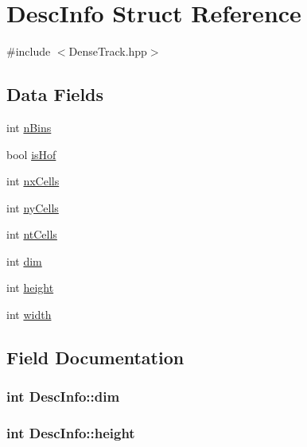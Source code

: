 \hypertarget{structDescInfo}{}\section{Desc\+Info Struct Reference}
\label{structDescInfo}


{\ttfamily \#include $<$Dense\+Track.\+hpp$>$}

\subsection*{Data Fields}
\begin{DoxyCompactItemize}
\item 
int \hyperlink{structDescInfo_a2bde776874112f43d29da2d9f41a1e59}{n\+Bins}
\item 
bool \hyperlink{structDescInfo_af63bbafd7460d3a13a1aed41ce3abcdd}{is\+Hof}
\item 
int \hyperlink{structDescInfo_ab00ff5d070ae53d16577e8578d624c7e}{nx\+Cells}
\item 
int \hyperlink{structDescInfo_a303f14d681cfc8a65d95d05c5ba77e52}{ny\+Cells}
\item 
int \hyperlink{structDescInfo_a2b010679bbd0b353d53164c5cea4fa8e}{nt\+Cells}
\item 
int \hyperlink{structDescInfo_a3374342a9cc783399c62ec2f36fc7b6e}{dim}
\item 
int \hyperlink{structDescInfo_ab2df923f0f6c2898ce3798cc72a9c314}{height}
\item 
int \hyperlink{structDescInfo_a4a2030ba863d45e2495e5f9dfafbe4b0}{width}
\end{DoxyCompactItemize}


\subsection{Field Documentation}
\hypertarget{structDescInfo_a3374342a9cc783399c62ec2f36fc7b6e}{}
\subsubsection[{dim}]{\setlength{\rightskip}{0pt plus 5cm}int Desc\+Info\+::dim}\label{structDescInfo_a3374342a9cc783399c62ec2f36fc7b6e}
\hypertarget{structDescInfo_ab2df923f0f6c2898ce3798cc72a9c314}{}
\subsubsection[{height}]{\setlength{\rightskip}{0pt plus 5cm}int Desc\+Info\+::height}\label{structDescInfo_ab2df923f0f6c2898ce3798cc72a9c314}
\hypertarget{structDescInfo_af63bbafd7460d3a13a1aed41ce3abcdd}{}
